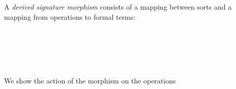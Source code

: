 A \emph{derived signature morphism} consists of a mapping between sorts
and a mapping from operations to formal terms:
\begin{code}
\>[0]\AgdaSpace{}%
\AgdaSpace{}%
\AgdaSymbol{(}\AgdaSpace{}%
\AgdaSpace{}%
\AgdaSymbol{:}\AgdaSpace{}%
\AgdaSymbol{)}\AgdaSpace{}%
\AgdaSymbol{:}\AgdaSpace{}%
\AgdaSpace{}%
\<%
\\
\>[0][@{}l@{\AgdaIndent{0}}]%
\>[1]\AgdaSpace{}%
\AgdaSpace{}%
\<%
\\
%
\>[1]\<%
\\
\>[1][@{}l@{\AgdaIndent{0}}]%
\>[2]\AgdaSpace{}%
\AgdaSymbol{:}\AgdaSpace{}%
\AgdaSpace{}%
\AgdaSpace{}%
\AgdaSpace{}%
\AgdaSpace{}%
\<%
\\
%
\>[2]\AgdaSpace{}%
\AgdaSymbol{:}\AgdaSpace{}%
\AgdaSpace{}%
\AgdaSymbol{\{}\AgdaSpace{}%
\AgdaSymbol{\}}%
\>[17]\AgdaSpace{}%
\AgdaSpace{}%
\AgdaSpace{}%
\AgdaSymbol{(}\AgdaSpace{}%
\AgdaOperator{\AgdaInductiveConstructor{,}}\AgdaSpace{}%
\AgdaSymbol{)}\AgdaSpace{}%
\AgdaSpace{}%
\AgdaSpace{}%
\AgdaSpace{}%
\AgdaSpace{}%
\AgdaSpace{}%
\AgdaSpace{}%
\<%
\end{code}
\noindent We show the action of the morphism on the operations 
